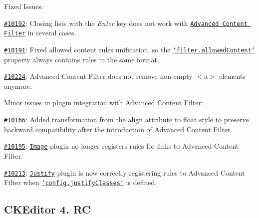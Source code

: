 Fixed Issues\-:
\begin{DoxyItemize}
\item \href{http://dev.ckeditor.com/ticket/10192}{\tt \#10192}\-: Closing lists with the {\itshape Enter} key does not work with \href{http://docs.ckeditor.com/#!/guide/dev_advanced_content_filter}{\tt Advanced Content Filter} in several cases.
\item \href{http://dev.ckeditor.com/ticket/10191}{\tt \#10191}\-: Fixed allowed content rules unification, so the \href{http://docs.ckeditor.com/#!/api/CKEDITOR.filter-property-allowedContent}{\tt `filter.allowed\-Content`} property always contains rules in the same format.
\item \href{http://dev.ckeditor.com/ticket/10224}{\tt \#10224}\-: Advanced Content Filter does not remove non-\/empty {\ttfamily $<$a$>$} elements anymore.
\item Minor issues in plugin integration with Advanced Content Filter\-:
\begin{DoxyItemize}
\item \href{http://dev.ckeditor.com/ticket/10166}{\tt \#10166}\-: Added transformation from the {\ttfamily align} attribute to {\ttfamily float} style to preserve backward compatibility after the introduction of Advanced Content Filter.
\item \href{http://dev.ckeditor.com/ticket/10195}{\tt \#10195}\-: \href{http://ckeditor.com/addon/image}{\tt Image} plugin no longer registers rules for links to Advanced Content Filter.
\item \href{http://dev.ckeditor.com/ticket/10213}{\tt \#10213}\-: \href{http://ckeditor.com/addon/justify}{\tt Justify} plugin is now correctly registering rules to Advanced Content Filter when \href{http://docs.ckeditor.com/#!/api/CKEDITOR.config-cfg-justifyClasses}{\tt `config.justify\-Classes`} is defined.
\end{DoxyItemize}
\end{DoxyItemize}

\subsection*{C\-K\-Editor 4. R\-C}

